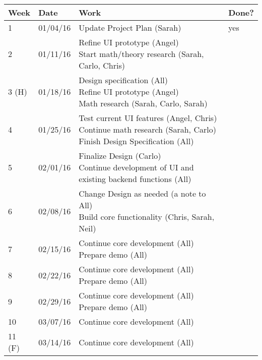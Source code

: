 \begin{table}[H]
\centering
\begin{tabular}{|l|l|l|l|}
\hline
Week 	& Date	 		& Work	 		& 	Done?	 \\ \hline
1		& 01/04/16	 	& Update Project Plan (Sarah)		& 	yes	 \\ \hline
2		& 01/11/16	 	& \specialcell{Refine UI prototype (Angel)  \\ Start math/theory research (Sarah, Carlo, Chris)}		& 			 \\ \hline
3 (H)	& 01/18/16	 	& \specialcell{Design specification (All) \\ Refine UI prototype (Angel) \\ Math research (Sarah, Carlo, Sarah)}		& 			 \\ \hline
4		& 01/25/16	 	& \specialcell{Test current UI features (Angel, Chris) \\ Continue math research (Sarah, Carlo) \\ Finish Design Specification (All)}		& 			 \\ \hline
5		& 02/01/16	 	& \specialcell{Finalize Design (Carlo) \\ Continue development of UI and existing backend functions (All)}	& 			 \\ \hline
6		& 02/08/16	 	& \specialcell{Change Design as needed (a note to All) \\ Build core functionality (Chris, Sarah, Neil)}		& 			 \\ \hline
7		& 02/15/16	 	& \specialcell{Continue core development (All) \\ Prepare demo (All)}		& 			 \\ \hline
8		& 02/22/16	 	& \specialcell{Continue core development (All) \\ Prepare demo (All)}	& 			 \\ \hline
9		& 02/29/16	 	& \specialcell{Continue core development (All) \\ Prepare demo (All)}	& 			 \\ \hline
10		& 03/07/16	 	& Continue core development (All)		& 			 \\ \hline
11 (F)	& 03/14/16	 	& Continue core development (All)			& 			 \\ \hline
\end{tabular}
\end{table}

